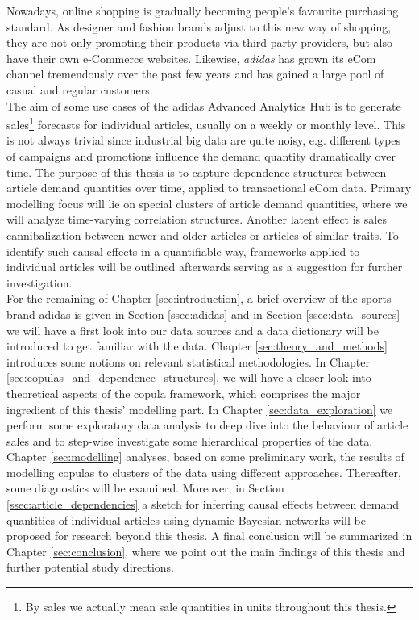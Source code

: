 

Nowadays, online shopping is gradually becoming people's favourite purchasing standard. As designer and fashion brands adjust to this new way of shopping, they are not only promoting their products via third party 	providers, but also have their own e-Commerce websites. Likewise, \textit{adidas} has grown its eCom channel tremendously over the past few years and has gained a large pool of casual and regular customers.
\\

The aim of some use cases of the adidas Advanced Analytics Hub is to generate sales\footnote{By sales we actually mean sale quantities in units throughout this thesis.} forecasts for individual articles, usually on a weekly or monthly level. This is not always trivial since industrial big data are quite noisy, e.g. different types of campaigns and promotions influence the demand quantity dramatically over time. The purpose of this thesis is to capture dependence structures between article demand quantities over time, applied to transactional eCom data. Primary modelling focus will lie on special clusters of article demand quantities, where we will analyze time-varying correlation structures. Another latent effect is sales cannibalization between newer and older articles or articles of similar traits. To identify such causal effects in a quantifiable way, frameworks applied to individual articles will be outlined afterwards serving as a suggestion for further investigation.
\\

For the remaining of Chapter \ref{sec:introduction}, a brief overview of the sports brand adidas is given in Section \ref{ssec:adidas} and in Section \ref{ssec:data_sources} we will have a first look into our data sources and a data dictionary will be introduced to get familiar with the data. Chapter \ref{sec:theory_and_methods} introduces some notions on relevant statistical methodologies. In Chapter \ref{sec:copulas_and_dependence_structures}, we will have a closer look into theoretical aspects of the copula framework, which comprises the major ingredient of this thesis' modelling part. In Chapter \ref{sec:data_exploration} we perform some exploratory data analysis to deep dive into the behaviour of article sales and to step-wise investigate some hierarchical properties of the data.  Chapter \ref{sec:modelling} analyses, based on some preliminary work, the results of modelling copulas to clusters of the data using different approaches. Thereafter, some diagnostics will be examined. Moreover, in Section \ref{ssec:article_dependencies} a sketch for inferring causal effects between demand quantities of individual articles using dynamic Bayesian networks will be proposed for research beyond this thesis. A final conclusion will be summarized in Chapter \ref{sec:conclusion}, where we point out the main findings of this thesis and further potential study directions.




